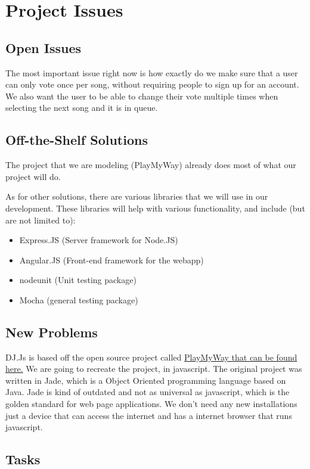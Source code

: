 \documentclass[12pt, titlepage]{article}
\begin{document}
\section{Project Issues}

\subsection{Open Issues}

The most important issue right now is how exactly do we make sure that a user can only vote once per song, without requiring people to sign up for an account. We also want the user to be able to change their vote multiple times when selecting the next song and it is in queue.

\subsection{Off-the-Shelf Solutions}

The project that we are modeling (PlayMyWay) already does most of what our project will do.

As for other solutions, there are various libraries that we will use in our
development. These libraries will help with various functionality, and include
(but are not limited to):
\begin{itemize}
\item Express.JS (Server framework for Node.JS)
\item Angular.JS (Front-end framework for the webapp)
\item nodeunit (Unit testing package)
\item Mocha (general testing package)
\end{itemize}
\subsection{New Problems}

DJ.Js is based off the open source project called \href{https://github.com/malithsen/playmyway}{PlayMyWay that can be found here.} We are going to recreate the project, in javascript. The original project was written in Jade, which is a Object Oriented programming language based on Java. Jade is kind of outdated and not as universal as javascript, which is the golden standard for web page applications. We don't need any new installations just a device that can access the internet and has a internet browser that runs javascript.

\subsection{Tasks}
\end{document}
